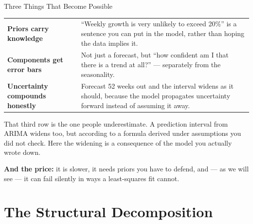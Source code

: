 \documentclass[aspectratio=169, 11pt]{beamer}
\begin{document}
\begin{frame}{Three Things That Become Possible}
  \begin{center}
    {\small
    \begin{tabular}{p{3.5cm}p{8.8cm}}
      \toprule
      \textbf{Priors carry knowledge} & ``Weekly growth is very unlikely to exceed 20\%'' is a
      sentence you can put in the model, rather than hoping the data implies it. \\[3pt]
      \textbf{Components get error bars} & Not just a forecast, but ``how confident am I that
      there is a trend at all?'' --- separately from the seasonality. \\[3pt]
      \textbf{Uncertainty compounds honestly} & Forecast 52 weeks out and the interval widens as
      it should, because the model propagates uncertainty forward instead of assuming it away. \\
      \bottomrule
    \end{tabular}
    }
  \end{center}

  \vspace{0.1cm}
  That third row is the one people underestimate. A prediction interval from ARIMA widens too,
  but according to a formula derived under assumptions you did not check. Here the widening is a
  consequence of the model you actually wrote down.

  \vspace{0.15cm}
  \textbf{And the price:} it is slower, it needs priors you have to defend, and --- as we will
  see --- it can fail silently in ways a least-squares fit cannot.
\end{frame}

\section{The Structural Decomposition}

\end{document}
